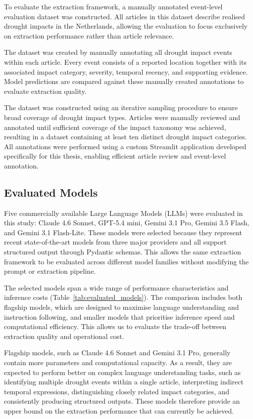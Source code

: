 

To evaluate the extraction framework, a manually annotated event-level evaluation dataset was constructed. All articles in this dataset describe realised drought impacts in the Netherlands, allowing the evaluation to focus exclusively on extraction performance rather than article relevance.

The dataset was created by manually annotating all drought impact events within each article. Every event consists of a reported location together with its associated impact category, severity, temporal recency, and supporting evidence. Model predictions are compared against these manually created annotations to evaluate extraction quality.

The dataset was constructed using an iterative sampling procedure to ensure broad coverage of drought impact types. Articles were manually reviewed and annotated until sufficient coverage of the impact taxonomy was achieved, resulting in a dataset containing at least ten distinct drought impact categories. All annotations were performed using a custom Streamlit application developed specifically for this thesis, enabling efficient article review and event-level annotation.

\subsection{Evaluated Models}

Five commercially available Large Language Models (LLMs) were evaluated in this study: Claude 4.6 Sonnet, GPT-5.4 mini, Gemini 3.1 Pro, Gemini 3.5 Flash, and Gemini 3.1 Flash-Lite. These models were selected because they represent recent state-of-the-art models from three major providers and all support structured output through Pydantic schemas. This allows the same extraction framework to be evaluated across different model families without modifying the prompt or extraction pipeline.

The selected models span a wide range of performance characteristics and inference costs (Table~\ref{tab:evaluated_models}). The comparison includes both flagship models, which are designed to maximise language understanding and instruction following, and smaller models that prioritise inference speed and computational efficiency. This allows us to evaluate the trade-off between extraction quality and operational cost.

Flagship models, such as Claude 4.6 Sonnet and Gemini 3.1 Pro, generally contain more parameters and computational capacity. As a result, they are expected to perform better on complex language understanding tasks, such as identifying multiple drought events within a single article, interpreting indirect temporal expressions, distinguishing closely related impact categories, and consistently producing structured outputs. These models therefore provide an upper bound on the extraction performance that can currently be achieved. 


